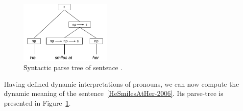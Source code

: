 \begin{figure}[h]
 \centering
    \includegraphics[width=0.4\textwidth]{images/HeSmilesatHer.pdf}
\caption{Syntactic parse tree of sentence .} \label{fig:ptS3-2006}
\end{figure}

Having defined dynamic interpretations of pronouns, we can now compute the dynamic meaning of the sentence~\eqref{HeSmilesAtHer-2006}. Its parse-tree is presented in Figure~\ref{fig:ptS3-2006}.


